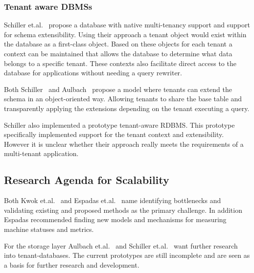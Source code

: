 

\subsubsection{Tenant aware \acp{DBMS}}
Schiller et.al.~\cite{schiller2011native} propose a database with native multi-tenancy support and support for schema extensibility.
Using their approach a tenant object would exist within the database as a first-class object. 
Based on these objects for each tenant a context can be maintained that allows the database to determine what data belongs to a specific tenant. 
These contexts also facilitate direct access to the database for applications without needing a query rewriter.

Both Schiller~\cite{schiller2011native} and Aulbach~\cite{aulbach2011extensibility} propose a model where tenants can extend the schema in an object-oriented way.
Allowing tenants to share the base table and transparently applying the extensions depending on the tenant executing a query.

Schiller also implemented a prototype tenant-aware \ac{RDBMS}.
This prototype specifically implemented support for the tenant context and extensibility.
However it is unclear whether their approach really meets the requirements of a multi-tenant application.



\subsection{Research Agenda for Scalability}
Both Kwok et.al.~\cite{kwok2008resource} and Espadas et.al.~\cite{espadas2013tenant} name identifying bottlenecks and validating existing and proposed methods as the primary challenge.
In addition Espadas recommended finding new models and mechanisms for measuring machine statuses and metrics.

For the storage layer Aulbach et.al.~\cite{aulbach2009comparison, aulbach2008multi} and Schiller et.al.~\cite{schiller2011native} want further research into tenant-databases. The current prototypes are still incomplete and are seen as a basis for further research and development.

